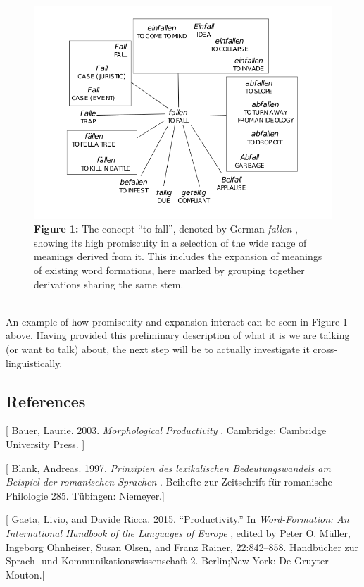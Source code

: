 \documentclass[
  english,
  a4paper,
  oneside,tablecaptionabove
]{scrbook}
\begin{document}
\begin{figure}
\centering
\includegraphics{images/__f.hypotheses.org_wp-content_blogs.dir_4500_files_2018_11_fallen.png}
\caption{{\textbf{Figure 1:} The concept \enquote{to fall}, denoted by
German \emph{fallen} , showing its high promiscuity in a selection of
the wide range of meanings derived from it. This includes the expansion
of meanings of existing word formations, here marked by grouping
together derivations sharing the same stem.}\\
~\\
}
\end{figure}

An example of how promiscuity and expansion interact can be seen in
Figure 1 above. Having provided this preliminary description of what it
is we are talking (or want to talk) about, the next step will be to
actually investigate it cross-linguistically.

\hypertarget{references-5}{%
\subsection*{References}\label{references-5}}

{[} Bauer, Laurie. 2003. \emph{Morphological Productivity} . Cambridge:
Cambridge University Press. {]}

{[} Blank, Andreas. 1997. \emph{Prinzipien des lexikalischen
Bedeutungswandels am Beispiel der romanischen Sprachen} . Beihefte zur
Zeitschrift für romanische Philologie 285. Tübingen: Niemeyer.{]}

{[} Gaeta, Livio, and Davide Ricca. 2015. \enquote{Productivity.} In
\emph{Word-Formation: An International Handbook of the Languages of
Europe} , edited by Peter O. Müller, Ingeborg Ohnheiser, Susan Olsen,
and Franz Rainer, 22:842--858. Handbücher zur Sprach- und
Kommunikationswissenschaft 2. Berlin;New York: De Gruyter Mouton.{]}
\end{document}
